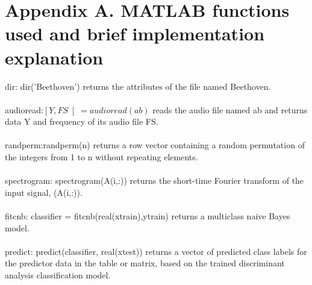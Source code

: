 \documentclass[12pt,letterpaper]{article}
\begin{document}
\newpage
\section*{Appendix A. MATLAB functions used and brief implementation explanation}
dir: dir('Beethoven') returns the attributes of the file named Beethoven.
\\
\\audioread:$\left[Y,FS\right[=audioread(ab)$ reads the audio file named ab and returns data Y and frequency of its audio file FS. 
\\
\\randperm:randperm(n) returns a row vector containing a random permutation of the integers from 1 to n without repeating elements.
\\
\\spectrogram: spectrogram(A(i,:)) returns the short-time Fourier transform of the input signal, (A(i,:)). 
\\
\\fitcnb: classifier = fitcnb(real(xtrain),ytrain) returns a multiclass naive Bayes model. 
\\
\\predict: predict(classifier, real(xtest))  returns a vector of predicted class labels for the predictor data in the table or matrix,  based on the trained discriminant analysis classification model. 





\newpage
\end{document}
